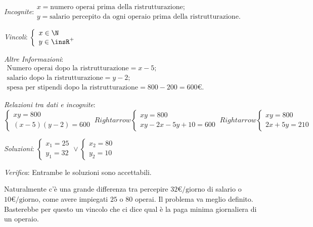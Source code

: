 \emph{Incognite}:\( \begin{array}{l}
x =\text{numero operai prima della ristrutturazione};\\
y= \text{salario percepito da ogni operaio prima della ristrutturazione}.
\end{array}\)

\emph{Vincoli}: \(\left\{\begin{array}{l}x\in \N\\y\in 
\insR^+\end{array}\right.\)

\emph{Altre Informazioni}: \( \begin{array}{l}
\text{Numero operai dopo la ristrutturazione} = x-5;\\
\text{salario dopo la ristrutturazione} =y-2;\\
\text{spesa per stipendi dopo la ristrutturazione} 
=800-200=600\unit{\text{€}}.\end{array}\)

\emph{Relazioni tra dati e incognite}:
\begin{equation*}
\left\{\begin{array}{l}{{xy}=800}\\{(x-5)(y-2)=600}\end{array}\right.\
Rightarrow 
\left\{\begin{array}{l}{{xy}=800}\\{{xy}-2x-5y+10=600}\end{array}\right.\
Rightarrow \left\{\begin{array}{l}{{xy}=800}\\{2x+5y=210}\end{array}\right.
\end{equation*}

\emph{Soluzioni}: 
\(\left\{\begin{array}{l}{x_1=25}\\{y_1=32}\end{array}\right.\vee 
\left\{\begin{array}{l}{x_2=80}\\{y_2=10}\end{array}\right.\)

\emph{Verifica}: Entrambe le soluzioni sono accettabili.

Naturalmente c'è una grande differenza tra percepire 
\(32\unit{\text{€/giorno}}\) di salario o \( 10\unit{\text{€/giorno}} \), come 
avere impiegati \( 25 \) o \( 80 \) operai. Il problema va meglio definito. 
Basterebbe per questo un vincolo che ci dice qual è la paga minima giornaliera 
di un operaio.

